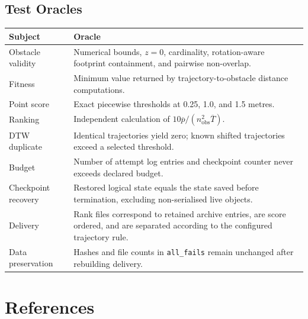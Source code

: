 \documentclass[11pt,a4paper,openany]{report}
\newcommand{\code}[1]{\texttt{#1}}
\begin{document}
\section{Test Oracles}
\begin{table}[H]
\centering
\begin{tabularx}{\textwidth}{L{4.2cm} Y}
\toprule
\textbf{Subject} & \textbf{Oracle}\\
\midrule
Obstacle validity & Numerical bounds, $z=0$, cardinality, rotation-aware footprint containment, and pairwise non-overlap.\\
Fitness & Minimum value returned by trajectory-to-obstacle distance computations.\\
Point score & Exact piecewise thresholds at 0.25, 1.0, and 1.5 metres.\\
Ranking & Independent calculation of $10\overline{p}/(n_{\mathrm{obs}}^2\overline{T})$.\\
DTW duplicate & Identical trajectories yield zero; known shifted trajectories exceed a selected threshold.\\
Budget & Number of attempt log entries and checkpoint counter never exceeds declared budget.\\
Checkpoint recovery & Restored logical state equals the state saved before termination, excluding non-serialised live objects.\\
Delivery & Rank files correspond to retained archive entries, are score ordered, and are separated according to the configured trajectory rule.\\
Data preservation & Hashes and file counts in \code{all\_fails} remain unchanged after rebuilding delivery.\\
\bottomrule
\end{tabularx}
\end{table}

\chapter{References}
\end{document}
